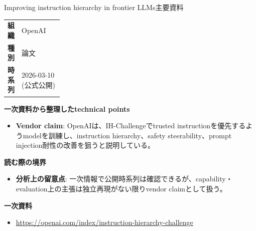 \begin{technicalnote}{Improving instruction hierarchy in frontier LLMs}{主要資料}
\begingroup
\begin{tabularx}{\linewidth}{@{}>{\bfseries}p{0.22\linewidth}X@{}}
組織 & OpenAI \\
種別 & 論文 \\
時系列 & 2026-03-10 (公式公開) \\
\end{tabularx}
\smallskip
{\bfseries 一次資料から整理したtechnical points}
\begin{itemize}[leftmargin=1.5em,itemsep=0.35em]
\item \textbf{Vendor claim}: OpenAIは、IH-Challengeでtrusted instructionを優先するようmodelを訓練し、instruction hierarchy、safety steerability、prompt injection耐性の改善を狙うと説明している。
\end{itemize}
\begin{minipage}{\linewidth}
{\bfseries 読む際の境界}
\begin{itemize}[leftmargin=1.5em,itemsep=0.35em]
\item \textbf{分析上の留意点}: 一次情報で公開時系列は確認できるが、capability・evaluation上の主張は独立再現がない限りvendor claimとして扱う。
\end{itemize}
\begin{samepage}
{\bfseries 一次資料}
\begingroup\sloppy
\begin{itemize}[leftmargin=1.5em,itemsep=0.25em]
\item {\scriptsize\url{https://openai.com/index/instruction-hierarchy-challenge}}
\end{itemize}
\endgroup
\end{samepage}
\end{minipage}
\endgroup
\end{technicalnote}
\medskip

